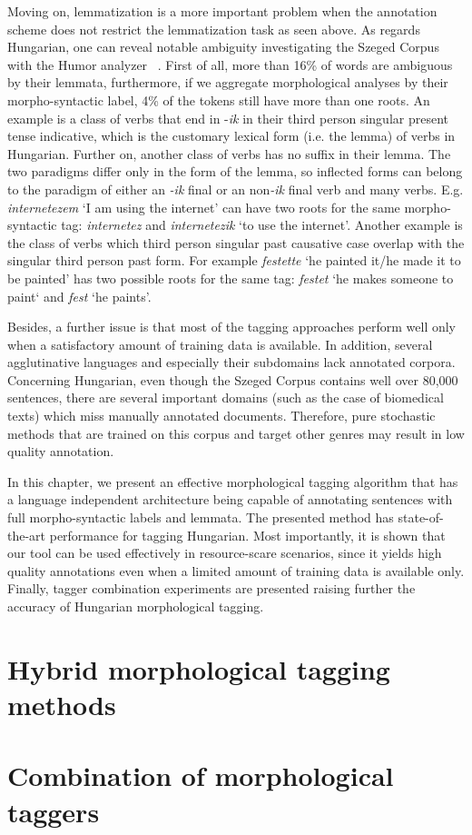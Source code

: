 Moving on, lemmatization is a more important problem when the annotation scheme does not restrict the lemmatization task as seen above. \label{par:lemma-ambiguity}
As regards Hungarian, one can reveal notable ambiguity investigating the Szeged Corpus~\cite{Csendes2004} with the Humor analyzer ~\cite{Proszeky1994,Novak2003,Proszeky2005}. 
First of all, more than 16\% of words are ambiguous by their lemmata, furthermore, if we aggregate morphological analyses by their morpho-syntactic label, 4\% of the tokens still have more than one roots. 
An example is a class of verbs that end in -\emph{ik} in their third person singular present tense indicative, which is the customary lexical form (i.e. the lemma) of verbs in Hungarian. Further on, another class of verbs has no suffix in their lemma. 
The two paradigms differ only in the form of the lemma, so inflected forms can belong to the paradigm of either an \emph{-ik} final or an non\emph{-ik} final verb and many verbs. 
E.g. \emph{internetezem} `I am using the internet' can have two roots for the same morpho-syntactic tag: \emph{internetez} and \emph{internetezik} `to use the internet'.
Another example is the class of verbs which third person singular past causative case overlap with the singular third person past form. 
For example \emph{festette} `he painted it/he made it to be painted' has two possible roots for the same tag: \emph{festet} `he makes someone to paint` and \emph{fest} `he paints'. 

Besides, a further issue is that most of the tagging approaches perform well only when a satisfactory amount of training data is available. 
In addition, several agglutinative languages and especially their subdomains lack annotated corpora. 
Concerning Hungarian, even though the Szeged Corpus contains well over 80,000 sentences, there are several important domains (such as the case of biomedical texts) which miss manually annotated documents. 
Therefore, pure stochastic methods that are trained on this corpus and target other genres may result in low quality annotation. 

In this chapter, we present an effective morphological tagging algorithm that has a language independent architecture being capable of annotating sentences with full morpho-syntactic labels and lemmata. 
The presented method has state-of-the-art performance for tagging Hungarian.
Most importantly, it is shown that our tool can be used effectively in resource-scare scenarios, since it yields high quality annotations even when a limited amount of training data is available only. 
Finally, tagger combination experiments are presented raising further the accuracy of Hungarian morphological tagging. 

\section{Hybrid morphological tagging methods}\label{sec:tagging}



\section{Combination of morphological taggers}\label{sec:combination}


 
